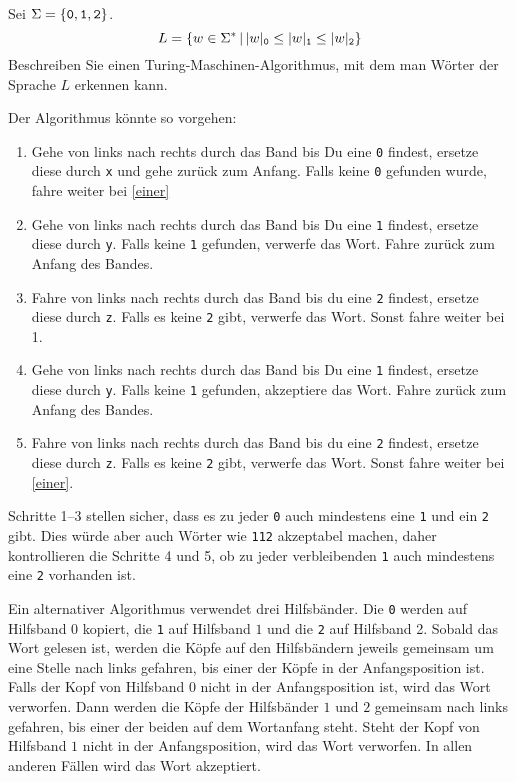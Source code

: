 Sei $\Sigma=\{{\tt 0},{\tt 1},{\tt 2}\}$.
\[
L=\{
w\in\Sigma^*
\,|\,
|w|_{\tt 0} \le
|w|_{\tt 1} \le
|w|_{\tt 2}
\}
\]
Beschreiben Sie einen Turing-Maschinen-Algorithmus, mit dem man Wörter der
Sprache $L$ erkennen kann.


\begin{loesung}
Der Algorithmus könnte so vorgehen:
\begin{enumerate}
\item Gehe von links nach rechts durch das Band bis Du eine
{\tt 0} findest, ersetze diese durch {\tt x} und gehe zurück
zum Anfang. Falls keine {\tt 0} gefunden wurde, fahre weiter bei
\ref{einer}
\item
Gehe von links nach rechts durch das Band bis Du eine
{\tt 1} findest, ersetze diese durch {\tt y}. Falls keine {\tt 1}
gefunden, verwerfe das Wort. Fahre zurück zum Anfang des Bandes.
\item Fahre von links nach rechts durch das Band bis du eine
{\tt 2} findest, ersetze diese durch {\tt z}. Falls es keine {\tt 2}
gibt, verwerfe das Wort. Sonst fahre weiter bei 1.
\item\label{einer}
Gehe von links nach rechts durch das Band bis Du eine
{\tt 1} findest, ersetze diese durch {\tt y}. Falls keine {\tt 1}
gefunden, akzeptiere das Wort. Fahre zurück zum Anfang des Bandes.
\item Fahre von links nach rechts durch das Band bis du eine
{\tt 2} findest, ersetze diese durch {\tt z}. Falls es keine {\tt 2}
gibt, verwerfe das Wort. Sonst fahre weiter bei \ref{einer}.
\end{enumerate}
Schritte 1--3 stellen sicher, dass es zu jeder {\tt 0} auch mindestens
eine {\tt 1} und ein {\tt 2} gibt. Dies würde aber auch Wörter wie
{\tt 112} akzeptabel machen, daher kontrollieren die Schritte 4 und 5,
ob zu jeder verbleibenden {\tt 1} auch mindestens eine {\tt 2}
vorhanden ist.

Ein alternativer Algorithmus verwendet drei Hilfsbänder.  Die {\tt 0}
werden auf Hilfsband $0$ kopiert, die {\tt 1} auf Hilfsband $1$ und
die {\tt 2} auf Hilfsband 2. Sobald das Wort gelesen ist, werden
die Köpfe auf den Hilfsbändern jeweils gemeinsam um eine Stelle nach
links gefahren, bis einer der Köpfe in der Anfangsposition ist.
Falls der Kopf von Hilfsband $0$ nicht in der Anfangsposition ist,
wird das Wort verworfen. Dann werden die Köpfe der Hilfsbänder $1$
und $2$ gemeinsam nach links gefahren, bis einer der beiden auf dem
Wortanfang steht. Steht der Kopf von Hilfsband $1$ nicht in der
Anfangsposition, wird das Wort verworfen. In allen anderen Fällen
wird das Wort akzeptiert.
\end{loesung}
